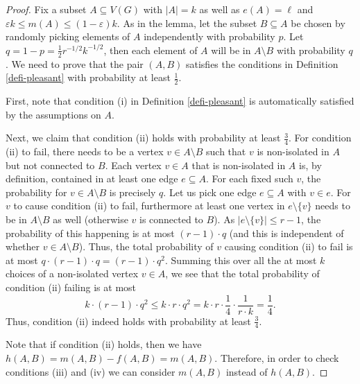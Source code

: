 \documentclass[11pt]{article}
\theoremstyle{definition}
\numberwithin{equation}{section}
\begin{document}
\begin{proof}Fix a subset $A\subseteq V(G)$ with $\vert A\vert=k$ as well as $e(A)=\ell$ and $\varepsilon k \leq m(A)\leq (1-\varepsilon) k$. As in the lemma, let the subset $B\subseteq A$ be chosen by randomly picking elements of $A$ independently with probability $p$. Let $q=1-p=\frac{1}{2}r^{-1/2}k^{-1/2}$, then each element of $A$ will be in $A\setminus B$ with probability $q$. We need to prove that the pair $(A,B)$ satisfies the conditions in Definition \ref{defi-pleasant} with probability at least $\frac{1}{2}$.

First, note that condition (i) in Definition \ref{defi-pleasant} is automatically satisfied by the assumptions on $A$.

Next, we claim that condition (ii) holds with probability at least $\frac{3}{4}$. For condition (ii) to fail, there needs to be a vertex $v\in A\setminus B$ such that $v$ is non-isolated in $A$ but not connected to $B$. Each vertex $v\in A$ that is non-isolated in $A$ is, by definition, contained in at least one edge $e\subseteq A$. For each fixed such $v$, the probability for $v\in A\setminus B$ is precisely $q$. Let us pick one edge $e\subseteq A$ with $v\in e$. For $v$ to cause condition (ii) to fail, furthermore at least one vertex in $e\setminus \lbrace v\rbrace$ needs to be in $A\setminus B$ as well (otherwise $v$ is connected to $B$). As $\vert e\setminus \lbrace v\rbrace\vert\leq r-1$, the probability of this happening is at most $(r-1)\cdot q$ (and this is independent of whether $v\in A\setminus B$). Thus, the total probability of $v$ causing condition (ii) to fail is at most $q\cdot (r-1)\cdot q=(r-1)\cdot q^2$. Summing this over all the at most $k$ choices of a non-isolated vertex $v\in A$, we see that the total probability of condition (ii) failing is at most
\[k\cdot (r-1)\cdot q^2\leq k\cdot r\cdot q^2=k\cdot r\cdot \frac{1}{4}\cdot \frac{1}{r\cdot k}=\frac{1}{4}.\]
Thus, condition (ii) indeed holds with probability at least $\frac{3}{4}$.

Note that if condition (ii) holds, then we have $h(A,B)=m(A,B)-f(A,B)=m(A,B)$. Therefore, in order to check conditions (iii) and (iv) we can consider $m(A,B)$ instead of $h(A,B)$.


\end{proof}
\end{document}
